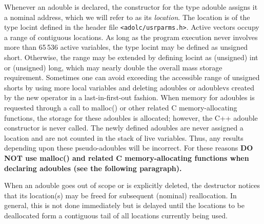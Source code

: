 \documentclass[11pt,twoside]{article}
\begin{document}
Whenever an {\sf adouble} is declared, the constructor for the type
{\sf adouble} assigns it a nominal address, which we will refer to as
its  {\em location}.  The location is of the type {\sf locint} defined
in the header file \verb=<adolc/usrparms.h>=. Active vectors occupy
a range of contiguous locations. As long as the program execution
never involves more than 65$\,$536 active variables, the type {\sf locint}
may be defined as {\sf unsigned short}. Otherwise, the range may be
extended by defining {\sf locint} as {\sf (unsigned) int} or
{\sf (unsigned) long}, which may nearly double
the overall mass storage requirement. Sometimes one can avoid exceeding
the accessible range of {\sf unsigned short}s by using more local variables and deleting
{\sf adouble}s or {\sf adoublev}s created by the new operator in a
last-in-first-out
fashion.  When memory for {\sf adouble}s is requested through a call to
{\sf malloc()} or other related C memory-allocating
functions, the storage for these {\sf adouble}s is allocated; however, the
C++ {\sf adouble} constructor is never called.  The newly defined
{\sf adouble}s are never assigned a location and are not counted in
the stack of live variables. Thus, any results depending upon these
pseudo-{\sf adouble}s will be incorrect. For these reasons {\bf DO NOT use
  malloc() and related C memory-allocating 
functions when declaring adoubles (see the following paragraph).}
%
%

When an {\sf adouble}
%
%
goes out of
scope or is explicitly deleted, the destructor notices that its
location(s) may be
freed for subsequent (nominal) reallocation. In general, this is not done
immediately but is delayed until the locations to be deallocated form a
contiguous tail of all locations currently being used.  
\end{document}

